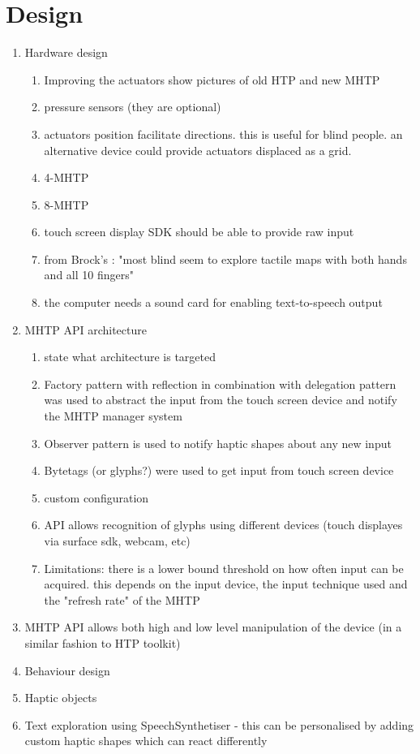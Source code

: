 \chapter{Design}

\begin{enumerate}
	\item Hardware design
    	\begin{enumerate}
        	\item Improving the actuators
            	show pictures of old HTP and new MHTP
            \item pressure sensors (they are optional)
            \item actuators position facilitate directions. this is useful for blind people. an alternative device could provide actuators displaced as a grid.
            \item 4-MHTP
            \item 8-MHTP
            \item touch screen display SDK should be able to provide raw input
            \item from Brock's : "most blind seem to explore tactile maps with both hands and all 10 fingers"
            \item the computer needs a sound card for enabling text-to-speech output
        \end{enumerate}
	\item MHTP API architecture
    	\begin{enumerate}
        	\item state what architecture is targeted
        	\item Factory pattern with reflection in combination with delegation pattern was used to abstract the input from the touch screen device and notify the MHTP manager system
            \item Observer pattern is used to notify haptic shapes about any new input
            \item Bytetags (or glyphs?) were used to get input from touch screen device
            \item custom configuration
            \item API allows recognition of glyphs using different devices (touch displayes via surface sdk, webcam, etc)
            \item Limitations: there is a lower bound threshold on how often input can be acquired. this depends on the input device, the input technique used and the "refresh rate" of the MHTP
        \end{enumerate}
    \item MHTP API allows both high and low level manipulation of the device (in a similar fashion to HTP toolkit)
    \item Behaviour design
    \item Haptic objects
    \item Text exploration using SpeechSynthetiser - this can be personalised by adding custom haptic shapes which can react differently
\end{enumerate}